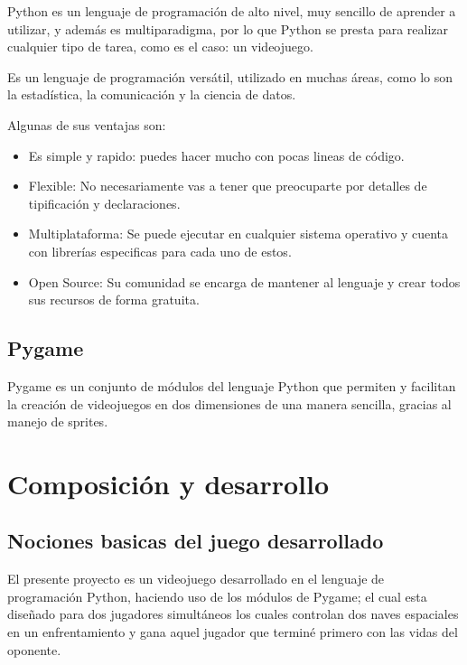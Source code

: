 \documentclass[12pt,letterpaper]{report}
\begin{document}
Python es un lenguaje de programación de alto nivel, muy sencillo de aprender a utilizar, y además es multiparadigma, por lo que Python se presta para realizar cualquier tipo de tarea, como es el caso: un videojuego.

Es un lenguaje de programación versátil, utilizado en muchas áreas, como lo son la estadística, la comunicación y la ciencia de datos. 

Algunas de sus ventajas son:

\begin{itemize}

\item Es simple y rapido: puedes hacer mucho con pocas lineas de código.

\item Flexible: No necesariamente vas a tener que preocuparte por detalles de tipificación y declaraciones.

\item Multiplataforma: Se puede ejecutar en cualquier sistema operativo y cuenta con librerías especificas para cada uno de estos.

\item Open Source: Su comunidad se encarga de mantener al lenguaje y crear todos sus recursos de forma gratuita.


\end{itemize}



\section{Pygame}

Pygame es un conjunto de módulos del lenguaje Python que permiten y facilitan la creación de videojuegos en dos dimensiones de una manera sencilla, gracias al manejo de sprites.





\chapter{Composición y desarrollo}

\section{Nociones basicas del juego desarrollado}
El presente proyecto es un videojuego desarrollado en el lenguaje de programación Python, haciendo uso de los módulos de Pygame; el cual esta diseñado para dos jugadores simultáneos los cuales controlan dos naves espaciales en un enfrentamiento y gana aquel jugador que terminé primero con las vidas del oponente.
\end{document}

